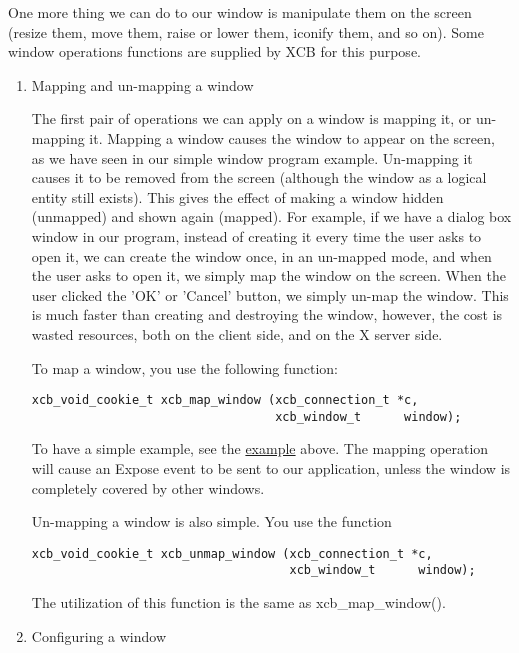 \documentclass[12pt,oneside,titlepage]{book}
\begin{document}
\begin{enumerate}
  One more thing we can do to our window is manipulate them on the
  screen (resize them, move them, raise or lower them, iconify them, and
  so on). Some window operations functions are supplied by XCB for this
  purpose.

  \begin{enumerate}
  \item
    \protect\hypertarget{winmap}{}{Mapping and un-mapping a window}

    The first pair of operations we can apply on a window is mapping it,
    or un-mapping it. Mapping a window causes the window to appear on
    the screen, as we have seen in our simple window program example.
    Un-mapping it causes it to be removed from the screen (although the
    window as a logical entity still exists). This gives the effect of
    making a window hidden (unmapped) and shown again (mapped). For
    example, if we have a dialog box window in our program, instead of
    creating it every time the user asks to open it, we can create the
    window once, in an un-mapped mode, and when the user asks to open
    it, we simply map the window on the screen. When the user clicked
    the 'OK' or 'Cancel' button, we simply un-map the window. This is
    much faster than creating and destroying the window, however, the
    cost is wasted resources, both on the client side, and on the X
    server side.

    To map a window, you use the following function:

\begin{verbatim}
xcb_void_cookie_t xcb_map_window (xcb_connection_t *c,
                                  xcb_window_t      window);
\end{verbatim}

    To have a simple example, see the
    \protect\hyperlink{helloworld}{example} above. The mapping operation
    will cause an {Expose} event to be sent to our application, unless
    the window is completely covered by other windows.

    Un-mapping a window is also simple. You use the function

\begin{verbatim}
xcb_void_cookie_t xcb_unmap_window (xcb_connection_t *c,
                                    xcb_window_t      window);
\end{verbatim}

    The utilization of this function is the same as
    {xcb\_map\_window()}.
  \item
    \protect\hypertarget{winconf}{}{Configuring a window}


\end{enumerate}
\end{enumerate}
\end{document}
